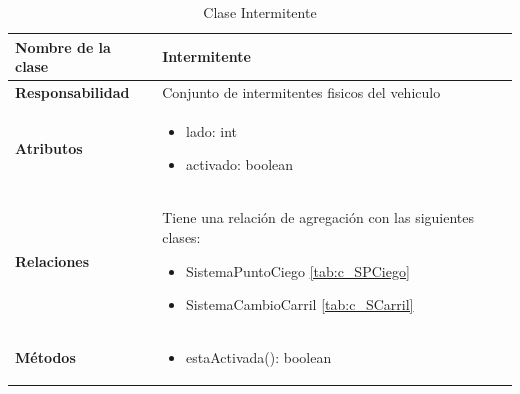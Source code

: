 \begin{table}[h]
\begin{center}
\begin{tabular}{p{} p{11cm}}
\textbf{Nombre de la clase} &  Intermitente\\ \hline \hline
\textbf{Responsabilidad} &  Conjunto de intermitentes fisicos del vehiculo\\ \hline
\textbf{Atributos} &  \begin{itemize} \item lado: int \item activado: boolean \end{itemize}\\ \hline
\textbf{Relaciones} & \par Tiene una relación de agregación con las siguientes clases:
                      \begin{itemize}
                        \item SistemaPuntoCiego \ref{tab:c_SPCiego}
                        \item SistemaCambioCarril \ref{tab:c_SCarril}
                      \end{itemize}
                      \\ \hline

\textbf{Métodos} &  \begin{itemize}
                      \item estaActivada(): boolean
                    \end{itemize}\\ \hline
\end{tabular}
\caption{Clase Intermitente}
\label{tab:c_Intermitente}
\end{center}
\end{table}








